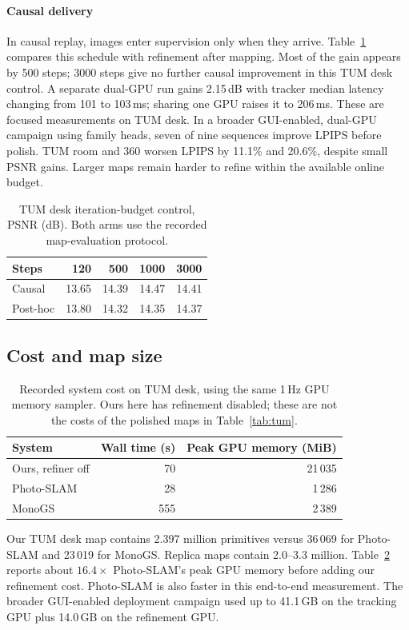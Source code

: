 \paragraph{Causal delivery}
In causal replay, images enter supervision only when they arrive.
Table~\ref{tab:budget} compares this schedule with refinement after mapping.
Most of the gain appears by 500 steps; 3000 steps give no further causal
improvement in this TUM desk control.
A separate dual-GPU run gains 2.15\,dB with tracker median latency changing
from 101 to 103\,ms; sharing one GPU raises it to 206\,ms.
These are focused measurements on TUM desk.
In a broader GUI-enabled, dual-GPU campaign using family heads, seven of nine
sequences improve LPIPS before polish. TUM room and 360 worsen LPIPS by
11.1\% and 20.6\%, despite small PSNR gains. Larger maps remain harder
to refine within the available online budget.

\begin{table}[t]
  \centering
  \caption{TUM desk iteration-budget control, PSNR (dB).
  Both arms use the recorded map-evaluation protocol.}
  \label{tab:budget}
  \small
  \begin{tabular}{@{}lrrrr@{}}
    \toprule
    Steps & 120 & 500 & 1000 & 3000\\
    \midrule
    Causal & 13.65 & 14.39 & 14.47 & 14.41\\
    Post-hoc & 13.80 & 14.32 & 14.35 & 14.37\\
    \bottomrule
  \end{tabular}
\end{table}

\subsection{Cost and map size}
\begin{table}[t]
  \centering
  \caption{Recorded system cost on TUM desk, using the same 1\,Hz GPU
  memory sampler. Ours here has refinement disabled; these are not the
  costs of the polished maps in Table~\ref{tab:tum}.}
  \label{tab:cost}
  \small
  \begin{tabular}{@{}lrr@{}}
    \toprule
    System & Wall time (s) & Peak GPU memory (MiB)\\
    \midrule
    Ours, refiner off & 70 & 21\,035\\
    Photo-SLAM & 28 & 1\,286\\
    MonoGS & 555 & 2\,389\\
    \bottomrule
  \end{tabular}
\end{table}
Our TUM desk map contains 2.397 million primitives versus 36\,069 for
Photo-SLAM and 23\,019 for MonoGS. Replica maps contain 2.0--3.3 million.
Table~\ref{tab:cost} reports about $16.4\times$ Photo-SLAM's peak GPU memory
before adding our refinement cost. Photo-SLAM is also faster in this
end-to-end measurement. The broader GUI-enabled deployment campaign used up
to 41.1\,GB on the tracking GPU plus 14.0\,GB on the refinement GPU.

